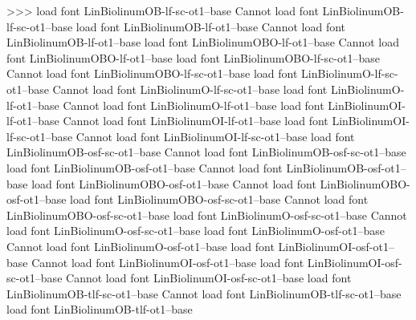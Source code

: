 {{{>>>
load font	LinBiolinumOB-lf-sc-ot1--base
Cannot load font LinBiolinumOB-lf-sc-ot1--base
load font	LinBiolinumOB-lf-ot1--base
Cannot load font LinBiolinumOB-lf-ot1--base
load font	LinBiolinumOBO-lf-ot1--base
Cannot load font LinBiolinumOBO-lf-ot1--base
load font	LinBiolinumOBO-lf-sc-ot1--base
Cannot load font LinBiolinumOBO-lf-sc-ot1--base
load font	LinBiolinumO-lf-sc-ot1--base
Cannot load font LinBiolinumO-lf-sc-ot1--base
load font	LinBiolinumO-lf-ot1--base
Cannot load font LinBiolinumO-lf-ot1--base
load font	LinBiolinumOI-lf-ot1--base
Cannot load font LinBiolinumOI-lf-ot1--base
load font	LinBiolinumOI-lf-sc-ot1--base
Cannot load font LinBiolinumOI-lf-sc-ot1--base
load font	LinBiolinumOB-osf-sc-ot1--base
Cannot load font LinBiolinumOB-osf-sc-ot1--base
load font	LinBiolinumOB-osf-ot1--base
Cannot load font LinBiolinumOB-osf-ot1--base
load font	LinBiolinumOBO-osf-ot1--base
Cannot load font LinBiolinumOBO-osf-ot1--base
load font	LinBiolinumOBO-osf-sc-ot1--base
Cannot load font LinBiolinumOBO-osf-sc-ot1--base
load font	LinBiolinumO-osf-sc-ot1--base
Cannot load font LinBiolinumO-osf-sc-ot1--base
load font	LinBiolinumO-osf-ot1--base
Cannot load font LinBiolinumO-osf-ot1--base
load font	LinBiolinumOI-osf-ot1--base
Cannot load font LinBiolinumOI-osf-ot1--base
load font	LinBiolinumOI-osf-sc-ot1--base
Cannot load font LinBiolinumOI-osf-sc-ot1--base
load font	LinBiolinumOB-tlf-sc-ot1--base
Cannot load font LinBiolinumOB-tlf-sc-ot1--base
load font	LinBiolinumOB-tlf-ot1--base
}}}
